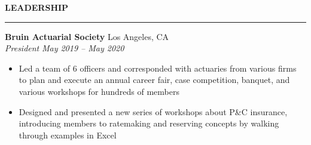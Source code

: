 \documentclass[11pt,letterpaper]{article}
\newcommand{\sectline}{\vspace{5pt}\hrule height 1.5pt\vspace{5pt}}
\newcommand{\sectspace}{\vspace{12pt}}
\begin{document}
\textbf{LEADERSHIP} \sectline
\textbf{Bruin Actuarial Society} \hfill Los Angeles, CA \\
\textit{President} \hfill \textit{May 2019 -- May 2020}
\begin{itemize}
	\item Led a team of 6 officers and corresponded with actuaries from various firms to plan and execute an annual career fair, case competition, banquet, and various workshops for hundreds of members
	\item Designed and presented a new series of workshops about P\&C insurance, introducing members to ratemaking and reserving concepts by walking through examples in Excel
\end{itemize}
\sectspace
\end{document}
